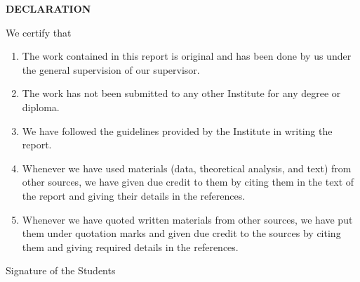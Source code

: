 \clearpage
\thispagestyle{plain}
\noindent\hspace{10mm}\textbf{DECLARATION}

\vspace{10mm}
\noindent\hspace{10mm}We certify that
\begin{enumerate}[label=\alph*., leftmargin=8mm, itemsep=2pt]
\item The work contained in this report is original and has been done by us under the
  general supervision of our supervisor.
\item The work has not been submitted to any other Institute for any degree or diploma.
\item We have followed the guidelines provided by the Institute in writing the report.
\item Whenever we have used materials (data, theoretical analysis, and text) from other
  sources, we have given due credit to them by citing them in the text of the report and
  giving their details in the references.
\item Whenever we have quoted written materials from other sources, we have put them
  under quotation marks and given due credit to the sources by citing them and giving
  required details in the references.
\end{enumerate}

\vspace{22mm}
\noindent
{\renewcommand{\Student}[2]{%
  \begin{minipage}[t]{0.32\textwidth}\centering
  \rule{40mm}{0.4pt}\\#1\\#2
  \end{minipage}\hfill}%
\StudentList}

\vspace{4mm}
\hfill Signature of the Students
